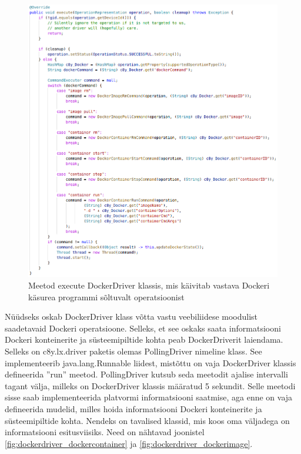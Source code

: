 \documentclass[12pt]{article}
\begin{document}
  \begin{figure} [ht] %
  \begin{center}
  \includegraphics[width=1.0\textwidth]{dockerdriver_execute}
  \caption{Meetod execute DockerDriver klassis, mis käivitab vastava Dockeri käsurea programmi sõltuvalt operatsioonist}
  \label{fig:dockerdriver_execute}
  \end{center}
  \end{figure}
 
  \FloatBarrier
 
 
  Nüüdseks oskab DockerDriver klass võtta vastu veebiliidese moodulist saadetavaid
  Dockeri operatsioone. Selleks, et see oskaks saata informatsiooni Dockeri konteinerite
  ja süsteemipiltide kohta peab DockerDriverit laiendama. Selleks on c8y.lx.driver
  paketis olemas PollingDriver nimeline klass. See implementeerib java.lang.Runnable
  liidest, mistõttu on vaja DockerDriver klassis defineerida ''run'' meetod.
  PollingDriver kutsub seda meetodit ajalise intervalli tagant välja, milleks on
  DockerDriver klassis määratud 5 sekundit. Selle meetodi sisse saab implementeerida
  platvormi informatsiooni saatmise, aga enne on vaja defineerida mudelid, milles hoida
  informatsiooni Dockeri konteinerite ja süsteemipiltide kohta. Nendeks on tavalised
  klassid, mis koos oma väljadega on informatsiooni esitusviisiks. Need on nähtavad
  joonistel \ref{fig:dockerdriver_dockercontainer} ja \ref{fig:dockerdriver_dockerimage}.
 
\end{document}
